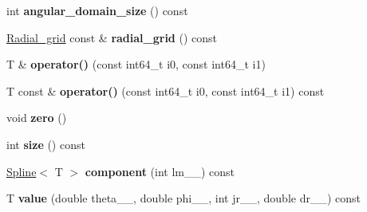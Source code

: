\begin{DoxyCompactItemize}
\item 
\hypertarget{classsirius_1_1_spheric__function_a639cf0ba9f49c93861b0375fd6d7429b}{}int {\bfseries angular\+\_\+domain\+\_\+size} () const \label{classsirius_1_1_spheric__function_a639cf0ba9f49c93861b0375fd6d7429b}

\item 
\hypertarget{classsirius_1_1_spheric__function_ab7e9bdee29fe82765747b87e447de10c}{}\hyperlink{classsirius_1_1_radial__grid}{Radial\+\_\+grid} const \& {\bfseries radial\+\_\+grid} () const \label{classsirius_1_1_spheric__function_ab7e9bdee29fe82765747b87e447de10c}

\item 
\hypertarget{classsirius_1_1_spheric__function_a1ca44ed60db65a9b5a5873b2009c0d77}{}T \& {\bfseries operator()} (const int64\+\_\+t i0, const int64\+\_\+t i1)\label{classsirius_1_1_spheric__function_a1ca44ed60db65a9b5a5873b2009c0d77}

\item 
\hypertarget{classsirius_1_1_spheric__function_a33db571d9a092d6d2ee6a80cc7171bfd}{}T const \& {\bfseries operator()} (const int64\+\_\+t i0, const int64\+\_\+t i1) const \label{classsirius_1_1_spheric__function_a33db571d9a092d6d2ee6a80cc7171bfd}

\item 
\hypertarget{classsirius_1_1_spheric__function_acb238d3d4a73fd8efdf1d3e2b77d94d3}{}void {\bfseries zero} ()\label{classsirius_1_1_spheric__function_acb238d3d4a73fd8efdf1d3e2b77d94d3}

\item 
\hypertarget{classsirius_1_1_spheric__function_a0a49bfdffb56f89aefcc6a670fe563f8}{}int {\bfseries size} () const \label{classsirius_1_1_spheric__function_a0a49bfdffb56f89aefcc6a670fe563f8}

\item 
\hypertarget{classsirius_1_1_spheric__function_abea142cfdb63c7eca939a46873eb084e}{}\hyperlink{classsirius_1_1_spline}{Spline}$<$ T $>$ {\bfseries component} (int lm\+\_\+\+\_\+) const \label{classsirius_1_1_spheric__function_abea142cfdb63c7eca939a46873eb084e}

\item 
\hypertarget{classsirius_1_1_spheric__function_a0d267555283c86bb4440aabf81beefa5}{}T {\bfseries value} (double theta\+\_\+\+\_\+, double phi\+\_\+\+\_\+, int jr\+\_\+\+\_\+, double dr\+\_\+\+\_\+) const \label{classsirius_1_1_spheric__function_a0d267555283c86bb4440aabf81beefa5}

\end{DoxyCompactItemize}
